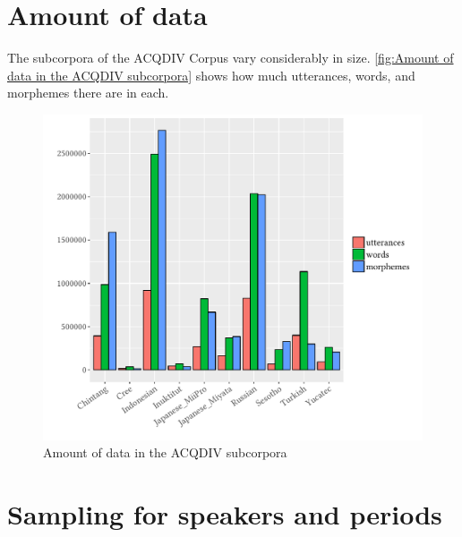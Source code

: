 \documentclass[a4paper, 11pt]{book}
\begin{document}
%

\newpage

\section{Amount of data}
\label{sec:Amount of data}

The subcorpora of the ACQDIV Corpus vary considerably in size. \autoref{fig:Amount of data in the ACQDIV subcorpora} shows how much utterances, words, and morphemes there are in each. 

\begin{figure}[ht!]
	\centering
	\includegraphics[scale=0.83]{pics/tokens_per_corpus.pdf}
	\caption{Amount of data in the ACQDIV subcorpora}
	\label{fig:Amount of data in the ACQDIV subcorpora}
\end{figure}

\section{Sampling for speakers and periods}
\label{sec:Sampling for speakers and periods}
\end{document}
